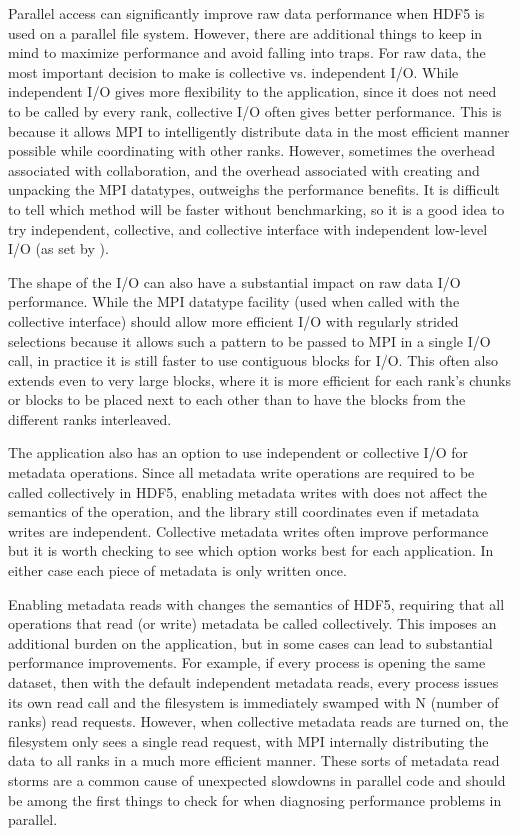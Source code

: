 \begin{itemize}
Parallel access can significantly improve raw data performance when HDF5 is used on a parallel file system. However, there are additional things to keep in mind to maximize performance and avoid falling into traps. For raw data, the most important decision to make is collective vs. independent I/O. While independent I/O gives more flexibility to the application, since it does not need to be called by every rank, collective I/O often gives better performance. This is because it allows MPI to intelligently distribute data in the most efficient manner possible while coordinating with other ranks. However, sometimes the overhead associated with collaboration, and the overhead associated with creating and unpacking the MPI datatypes, outweighs the performance benefits. It is difficult to tell which method will be faster without benchmarking, so it is a good idea to try independent, collective, and collective interface with independent low-level I/O (as set by ).

The shape of the I/O can also have a substantial impact on raw data I/O performance. While the MPI datatype facility (used when called with the collective interface) should allow more efficient I/O with regularly strided selections because it allows such a pattern to be passed to MPI in a single I/O call, in practice it is still faster to use contiguous blocks for I/O. This often also extends even to very large blocks, where it is more efficient for each rank's chunks or blocks to be placed next to each other than to have the blocks from the different ranks interleaved.

The application also has an option to use independent or collective I/O for metadata operations. Since all metadata write operations are required to be called collectively in HDF5, enabling metadata writes with  does not affect the semantics of the operation, and the library still coordinates even if metadata writes are independent. Collective metadata writes often improve performance but it is worth checking to see which option works best for each application. In either case each piece of metadata is only written once.

Enabling metadata reads with  changes the semantics of HDF5, requiring that all operations that read (or write) metadata be called collectively. This imposes an additional burden on the application, but in some cases can lead to substantial performance improvements. For example, if every process is opening the same dataset, then with the default independent metadata reads, every process issues its own read call and the filesystem is immediately swamped with N (number of ranks) read requests. However, when collective metadata reads are turned on, the filesystem only sees a single read request, with MPI internally distributing the data to all ranks in a much more efficient manner. These sorts of metadata read storms are a common cause of unexpected slowdowns in parallel code and should be among the first things to check for when diagnosing performance problems in parallel.


\end{itemize}

